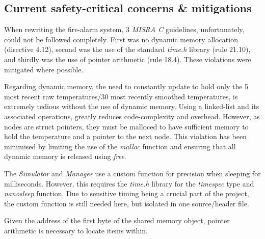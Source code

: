 \documentclass[a4paper]{article}
\begin{document}
\subsection{Current safety-critical concerns \& mitigations}

\par When rewriting the fire-alarm system, 3 \emph{MISRA C} guidelines, unfortunately, could not be followed completely. First was no dynamic memory allocation (directive 4.12), second was the use of the standard \emph{time.h} library (rule 21.10), and thirdly was the use of pointer arithmetic (rule 18.4). These violations were mitigated where possible.

\par Regarding dynamic memory, the need to constantly update to hold only the 5 most recent raw temperatures/30 most recently smoothed temperatures, is extremely tedious without the use of dynamic memory. Using a linked-list and its associated operations, greatly reduces code-complexity and overhead. However, as nodes are struct pointers, they must be malloced to have sufficient memory to hold the temperature and a pointer to the next node. This violation has been minimised by limiting the use of the \emph{malloc} function and ensuring that all dynamic memory is released using \emph{free}.

\par The \emph{Simulator} and \emph{Manager} use a custom function for precision when sleeping for milliseconds. However, this requires the \emph{time.h} library for the \emph{timespec} type and \emph{nanosleep} function. Due to sensitive timing being a crucial part of the project, the custom function is still needed here, but isolated in one source/header file.

\par Given the address of the first byte of the shared memory object, pointer arithmetic is necessary to locate items within.

\end{document}
